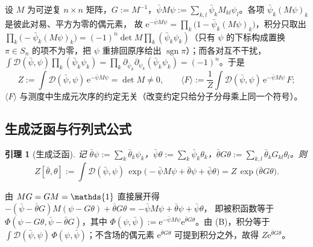 \documentclass[UTF8,a4paper,11pt,fontset=fandol]{ctexart}
\makeatletter
\let\amsmathbb\mathbb
\renewcommand{\mathbb}[1]{\ifx1#1\mathds{1}\else\amsmathbb{#1}\fi}
\theoremstyle{cplain}
\newtheorem{lemma}[theorem]{引理}
\theoremstyle{cdefinition}
\theoremstyle{cremark}
\renewcommand{\proofname}{证明}
\renewenvironment{proof}[1][\proofname]{\par\pushQED{\qed}\normalfont\topsep6\p@\@plus6\p@\relax
  \trivlist\item[\hskip\labelsep\itshape #1\hspace{0.5em}]\ignorespaces}{\popQED\endtrivlist\@endpefalse}
\numberwithin{equation}{section}
\newcommand{\ee}{\mathrm{e}}                        %
\makeatother
\begin{document}
设 $M$ 为可逆复 $n\times n$ 矩阵，$G:=M^{-1}$，$\bar\psi M\psi:=\sum_{k,l}\bar\psi_kM_{kl}\psi_l$。各项 $\bar\psi_k(M\psi)_k$ 是彼此对易、平方为零的偶元素，
故 $\ee^{-\bar\psi M\psi}=\prod_k\bigl(1-\bar\psi_k(M\psi)_k\bigr)$，积分只取出
$\prod_k\bigl(-\bar\psi_k(M\psi)_k\bigr)=(-1)^n\det M\prod_k(\bar\psi_k\psi_k)$（只有 $\psi$ 的下标构成置换 $\pi\in S_n$ 的项不为零，把 $\psi$ 重排回原序给出 $\operatorname{sgn}\pi$）；而各对互不干扰，
$\int\mathcal D(\bar\psi,\psi)\prod_k(\bar\psi_k\psi_k)=\prod_k\partial_{\bar\psi_k}\partial_{\psi_k}(\bar\psi_k\psi_k)=(-1)^n$。于是
\begin{equation}\label{eq:app-wick-Z}
Z:=\int\!\mathcal D(\bar\psi,\psi)\,\ee^{-\bar\psi M\psi}=\det M\neq0 ,\qquad
\langle F\rangle:=\frac1Z\int\!\mathcal D(\bar\psi,\psi)\,\ee^{-\bar\psi M\psi}\,F ;
\end{equation}
$\langle F\rangle$ 与测度中生成元次序的约定无关（改变约定只给分子分母乘上同一个符号）。

\subsection{生成泛函与行列式公式}\label{app:wick-det}

\begin{lemma}[生成泛函]\label{lem:app-wick-genfun}
记 $\bar\theta\psi:=\sum_k\bar\theta_k\psi_k$，$\bar\psi\theta:=\sum_k\bar\psi_k\theta_k$，$\bar\theta G\theta:=\sum_{k,l}\bar\theta_kG_{kl}\theta_l$。则
\begin{equation}\label{eq:app-wick-genfun}
Z[\bar\theta,\theta]:=\int\!\mathcal D(\bar\psi,\psi)\,\exp\bigl(-\bar\psi M\psi+\bar\theta\psi+\bar\psi\theta\bigr)=Z\,\exp\bigl(\bar\theta G\theta\bigr).
\end{equation}
\end{lemma}

\begin{proof}
由 $MG=GM=\mathbb 1$ 直接展开得
$-(\bar\psi-\bar\theta G)M(\psi-G\theta)+\bar\theta G\theta=-\bar\psi M\psi+\bar\theta\psi+\bar\psi\theta$，
即被积函数等于 $\Phi(\psi-G\theta,\bar\psi-\bar\theta G)$，其中 $\Phi(\psi,\bar\psi):=\ee^{-\bar\psi M\psi}\ee^{\bar\theta G\theta}$。由 (B)，积分等于
$\int\mathcal D(\bar\psi,\psi)\,\Phi(\psi,\bar\psi)$；不含场的偶元素 $\ee^{\bar\theta G\theta}$ 可提到积分之外，故得 $Z\ee^{\bar\theta G\theta}$。
\end{proof}
\end{document}
